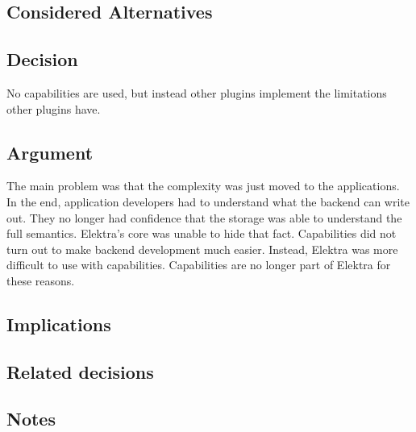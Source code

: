 \subsection*{Considered Alternatives}

\subsection*{Decision}

No capabilities are used, but instead other plugins implement the limitations other plugins have.

\subsection*{Argument}

The main problem was that the complexity was just moved to the applications. In the end, application developers had to understand what the backend can write out. They no longer had confidence that the storage was able to understand the full semantics. Elektra’s core was unable to hide that fact. Capabilities did not turn out to make backend development much easier. Instead, Elektra was more difficult to use with capabilities. Capabilities are no longer part of Elektra for these reasons.

\subsection*{Implications}

\subsection*{Related decisions}

\subsection*{Notes}